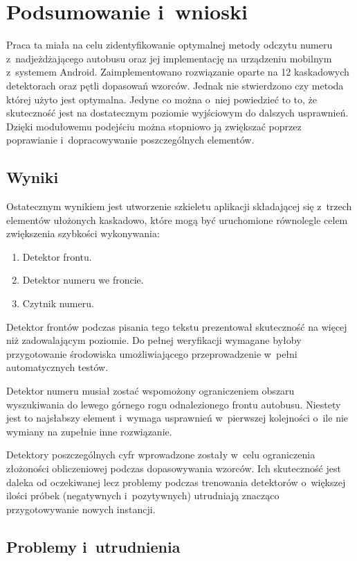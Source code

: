\chapter{Podsumowanie i~wnioski}

Praca ta miała na celu zidentyfikowanie optymalnej metody
odczytu numeru z~nadjeżdżającego autobusu oraz jej implementację
na urządzeniu mobilnym z~systemem Android. Zaimplementowano
rozwiązanie oparte na 12 kaskadowych detektorach oraz pętli 
dopasowań wzorców. Jednak nie stwierdzono czy metoda której użyto
jest optymalna. Jedyne co można o~niej powiedzieć to to, że
skuteczność jest na dostatecznym poziomie wyjściowym do dalszych 
usprawnień. Dzięki modułowemu podejściu można stopniowo ją
zwiększać poprzez poprawianie i~dopracowywanie poszczególnych
elementów. 

\section{Wyniki}

Ostatecznym wynikiem jest utworzenie szkieletu aplikacji
składającej się z~trzech elementów ułożonych kaskadowo, które
mogą być uruchomione równolegle celem zwiększenia szybkości wykonywania:

\begin{enumerate}
    \item Detektor frontu.
    \item Detektor numeru we froncie.
    \item Czytnik numeru.
\end{enumerate}

Detektor frontów podczas pisania tego tekstu prezentował skuteczność
na więcej niż zadowalającym poziomie. Do pełnej weryfikacji 
wymagane byłoby przygotowanie środowiska umożliwiającego przeprowadzenie
w~pełni automatycznych testów.

Detektor numeru musiał zostać wspomożony ograniczeniem obszaru wyszukiwania
do lewego górnego rogu odnalezionego frontu autobusu. Niestety 
jest to najsłabszy element i~wymaga usprawnień w~pierwszej
kolejności o~ile nie wymiany na zupełnie inne rozwiązanie.

Detektory poszczególnych cyfr wprowadzone zostały w~celu ograniczenia
złożoności obliczeniowej podczas dopasowywania wzorców. Ich skuteczność
jest daleka od oczekiwanej lecz problemy podczas trenowania detektorów
o~większej ilości próbek (negatywnych i~pozytywnych)
utrudniają znacząco przygotowywanie nowych instancji.

\section{Problemy i~utrudnienia}

